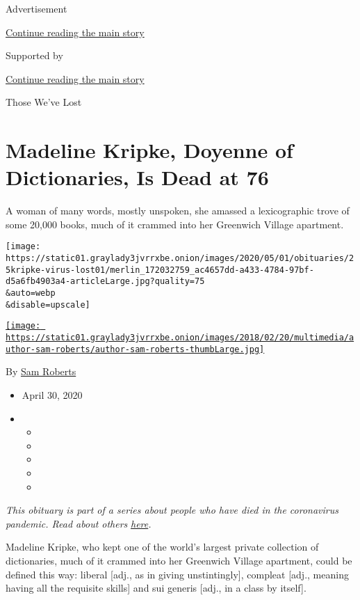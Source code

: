 Advertisement

\protect\hyperlink{after-top}{Continue reading the main story}

Supported by

\protect\hyperlink{after-sponsor}{Continue reading the main story}

Those We've Lost

\hypertarget{madeline-kripke-doyenne-of-dictionaries-is-dead-at-76}{%
\section{Madeline Kripke, Doyenne of Dictionaries, Is Dead at
76}\label{madeline-kripke-doyenne-of-dictionaries-is-dead-at-76}}

A woman of many words, mostly unspoken, she amassed a lexicographic
trove of some 20,000 books, much of it crammed into her Greenwich
Village apartment.

\texttt{[image: https://static01.graylady3jvrrxbe.onion/images/2020/05/01/obituaries/25kripke-virus-lost01/merlin\_172032759\_ac4657dd-a433-4784-97bf-d5a6fb4903a4-articleLarge.jpg?quality=75\\\&auto=webp\\\&disable=upscale]}

\href{https://www.nytimes3xbfgragh.onion/by/sam-roberts}{\texttt{[image: https://static01.graylady3jvrrxbe.onion/images/2018/02/20/multimedia/author-sam-roberts/author-sam-roberts-thumbLarge.jpg]}}

By \href{https://www.nytimes3xbfgragh.onion/by/sam-roberts}{Sam Roberts}

\begin{itemize}
\item
  April 30, 2020
\item
  \begin{itemize}
  \item
  \item
  \item
  \item
  \item
  \end{itemize}
\end{itemize}

\emph{This obituary is part of a series about people who have died in
the coronavirus pandemic. Read about others}
\href{https://www.nytimes3xbfgragh.onion/series/people-who-have-died-of-the-coronavirus}{\emph{here}}\emph{.}

Madeline Kripke, who kept one of the world's largest private collection
of dictionaries, much of it crammed into her Greenwich Village
apartment, could be defined this way: liberal {[}adj., as in giving
unstintingly{]}, compleat {[}adj., meaning having all the requisite
skills{]} and sui generis {[}adj., in a class by itself{]}.


